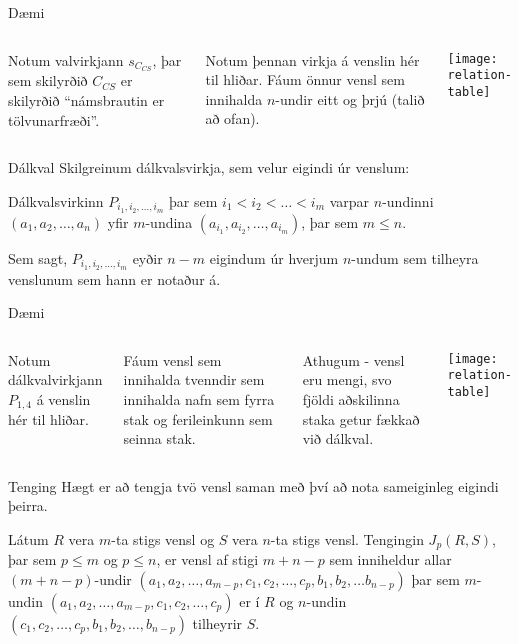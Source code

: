 \documentclass[handout]{beamer}
\begin{document}
\begin{frame}{Dæmi}
\begin{columns}
Notum valvirkjann $s_{C_{CS}}$, þar sem skilyrðið $C_{CS}$ er skilyrðið ``námsbrautin er tölvunarfræði''.
\vspace{0.5cm}

Notum þennan virkja á venslin hér til hliðar. Fáum önnur vensl sem innihalda $n$-undir eitt og þrjú (talið að ofan).
\begin{center}
\texttt{[image: relation-table]}
\end{center}
\end{columns}
\end{frame}

\begin{frame}{Dálkval}
Skilgreinum dálkvalsvirkja, sem velur eigindi úr venslum:

\begin{tcolorbox}[title=Dálkval]
Dálkvalsvirkinn $P_{i_1, i_2, \ldots, i_m}$ þar sem $i_1 < i_2 < \ldots < i_m$ varpar $n$-undinni $(a_1, a_2, \ldots, a_n)$ yfir $m$-undina $(a_{i_1}, a_{i_2}, \ldots, a_{i_m})$, þar sem $m \leq n$.
\end{tcolorbox}
Sem sagt, $P_{i_1, i_2, \ldots, i_m}$ eyðir $n-m$ eigindum úr hverjum $n$-undum sem tilheyra venslunum sem hann er notaður á.
\end{frame}

\begin{frame}{Dæmi}
\begin{columns}
Notum dálkvalvirkjann $P_{1,4}$ á venslin hér til hliðar.

\vspace{0.5cm}
Fáum vensl sem innihalda tvenndir sem innihalda nafn sem fyrra stak og ferileinkunn sem seinna stak.

\vspace{0.5cm}
Athugum - vensl eru mengi, svo fjöldi aðskilinna staka getur fækkað við dálkval.
\begin{center}
\texttt{[image: relation-table]}
\end{center}
\end{columns}
\end{frame}

\begin{frame}{Tenging}
Hægt er að tengja tvö vensl saman með því að nota sameiginleg eigindi þeirra.

\begin{tcolorbox}[title=Tenging]
Látum $R$ vera $m$-ta stigs vensl og $S$ vera $n$-ta stigs vensl. Tengingin $J_p(R,S)$, þar sem $p\leq m$ og $p \leq n$, er vensl af stigi $m+n-p$ sem inniheldur allar $(m+n-p)$-undir $(a_1, a_2, \ldots, a_{m-p}, c_1, c_2, \ldots, c_p, b_1, b_2, \ldots b_{n-p})$ þar sem $m$-undin $(a_1 , a_2 , \ldots , a_{m-p} , c_1 , c_2 , \ldots , c_p )$ er í $R$ og $n$-undin $(c_1 , c_2 , \ldots , c_p , b_1 , b_2 , \ldots , b_{n-p} )$ tilheyrir $S$.
\end{tcolorbox}

\end{frame}
\end{document}

